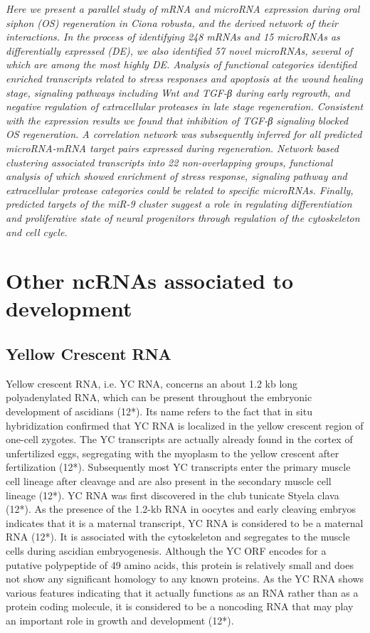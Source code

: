 \documentclass[graybox]{svmult}
\begin{document}
\cite{Spina2017}
\textit{Here we present a parallel study of mRNA and microRNA expression during oral siphon (OS) regeneration in Ciona robusta, and the derived network of their interactions. In the process of identifying 248 mRNAs and 15 microRNAs as differentially expressed (DE), we also identified 57 novel microRNAs, several of which are among the most highly DE. Analysis of functional categories identified enriched transcripts related to stress responses and apoptosis at the wound healing stage, signaling pathways including Wnt and TGF-β during early regrowth, and negative regulation of extracellular proteases in late stage regeneration. Consistent with the expression results we found that inhibition of TGF-β signaling blocked OS regeneration. A correlation network was subsequently inferred for all predicted microRNA-mRNA target pairs expressed during regeneration. Network based clustering associated transcripts into 22 non-overlapping groups, functional analysis of which showed enrichment of stress response, signaling pathway and extracellular protease categories could be related to specific microRNAs. Finally, predicted targets of the miR-9 cluster suggest a role in regulating differentiation and proliferative state of neural progenitors through regulation of the cytoskeleton and cell cycle.}

\section{Other ncRNAs associated to development}
\label{sec:4}

\subsection{Yellow Crescent RNA}
Yellow crescent RNA, i.e. YC RNA, concerns an about 1.2 kb long polyadenylated 
RNA, which can be present throughout the embryonic development of ascidians 
(12*). Its name refers to the fact that in situ hybridization confirmed that YC 
RNA is localized in the yellow crescent region of one-cell zygotes. The YC 
transcripts are actually already found in the cortex of unfertilized eggs, 
segregating with the myoplasm to the yellow crescent after fertilization (12*). 
Subsequently most YC transcripts enter the primary muscle cell lineage after 
cleavage and are also present in the secondary muscle cell lineage (12*). 
	YC RNA was first discovered in the club tunicate Styela clava (12*). As 
the presence of the 1.2-kb RNA in oocytes and early cleaving embryos indicates 
that it is a maternal transcript, YC RNA is considered to be a maternal RNA 
(12*). It is associated with the cytoskeleton and segregates to the muscle cells 
during ascidian embryogenesis. Although the YC ORF encodes for a putative 
polypeptide of 49 amino acids, this protein is relatively small and does not 
show any significant homology to any known proteins. As the YC RNA shows various 
features indicating that it actually functions as an RNA rather than as a 
protein coding molecule, it is considered to be a noncoding RNA that may play an 
important role in growth and development (12*).
\end{document}
